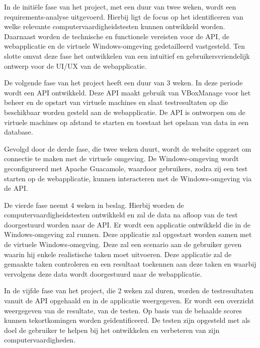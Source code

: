 

In de initiële fase van het project, met een duur van twee weken, wordt een requirements-analyse uitgevoerd. Hierbij ligt de focus op het identificeren van welke relevante computervaardigheidstesten kunnen ontwikkeld worden.
Daarnaast worden de technische en functionele vereisten voor de API, de webapplicatie en de virtuele Windows-omgeving gedetailleerd vastgesteld. Ten slotte omvat deze fase het ontwikkelen van een intuïtief en gebruikersvriendelijk ontwerp voor de UI/UX van de webapplicatie.

De volgende fase van het project heeft een duur van 3 weken. In deze periode wordt een API ontwikkeld. Deze API maakt gebruik van VBoxManage voor het beheer en de opstart van virtuele machines en slaat testresultaten op die beschikbaar worden gesteld aan de webapplicatie. De API is ontworpen om de virtuele machines op afstand te starten en toestaat het opslaan van data in een database.

Gevolgd door de derde fase, die twee weken duurt, wordt de website opgezet om connectie te maken met de virtuele omgeving. De Windows-omgeving wordt geconfigureerd met Apache Guacamole, waardoor gebruikers, zodra zij een test starten op de webapplicatie, kunnen interacteren met de Windows-omgeving via de API.

De vierde fase neemt 4 weken in beslag. Hierbij worden de computervaardigheidstesten ontwikkeld en zal de data na afloop van de test doorgestuurd worden naar de API. Er wordt een applicatie ontwikkeld die in de Windows-omgeving zal runnen. Deze applicatie zal opgestart worden samen met de virtuele Windows-omegving. Deze zal een scenario aan de gebruiker geven waarin hij enkele realistische taken moet uitvoeren. Deze applicatie zal de gemaakte taken controleren en een resultaat toekennen aan deze taken en waarbij vervolgens deze data wordt doorgestuurd naar de webapplicatie.

In de vijfde fase van het project, die 2 weken zal duren, worden de testresultaten vanuit de API opgehaald en in de applicatie weergegeven. Er wordt een overzicht weergegeven van de resultate, van de testen. Op basis van de behaalde scores kunnen tekortkomingen worden geïdentificeerd. De testen zijn opgesteld met als doel de gebruiker te helpen bij het ontwikkelen en verbeteren van zijn computervaardigheden.

